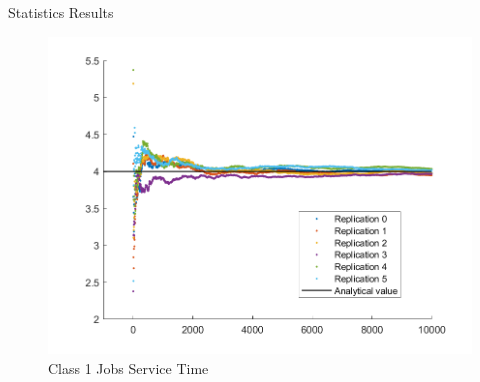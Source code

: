 \documentclass[10pt]{beamer}
\begin{document}
\begin{frame}[fragile]{Statistics Results}{}

\begin{figure}
\centering
\includegraphics[width=\textwidth]{./images/ScatterPlotCloud_Class1JobsServiceTime.png}
\caption{Class 1 Jobs Service Time}
\label{fig:Concorrente}
\end{figure}


\end{frame}





{\1
\begin{frame}
\end{frame}}
\end{document}
